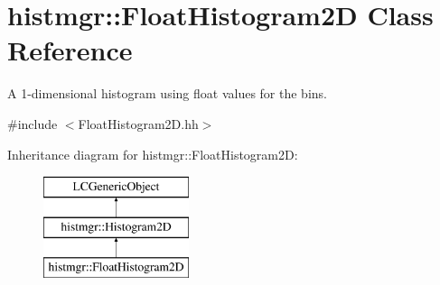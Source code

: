 \section{histmgr\-:\-:Float\-Histogram2\-D Class Reference}
\label{classhistmgr_1_1FloatHistogram2D}


A 1-\/dimensional histogram using float values for the bins.  




{\ttfamily \#include $<$Float\-Histogram2\-D.\-hh$>$}

Inheritance diagram for histmgr\-:\-:Float\-Histogram2\-D\-:\begin{figure}[H]
\begin{center}
\leavevmode
\includegraphics[height=3.000000cm]{classhistmgr_1_1FloatHistogram2D}
\end{center}
\end{figure}
